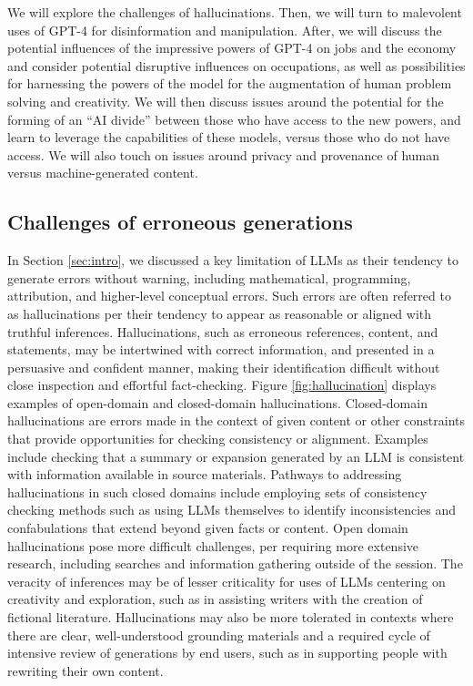 We will explore the challenges of hallucinations. Then, we will turn to malevolent uses of {GPT-4} for disinformation and manipulation.  After, we will discuss the potential influences of the impressive powers of {GPT-4} on jobs and the economy and consider potential disruptive influences on occupations, as well as possibilities for harnessing the powers of the model for the augmentation of human problem solving and creativity.  We will then discuss issues around the potential for the forming of an ``AI divide'' between those who have access to the new powers, and learn to leverage the capabilities of these models, versus those who do not have access. We will also touch on issues around privacy and provenance of human versus machine-generated content.

\subsection{Challenges of erroneous generations} 

In Section \ref{sec:intro}, we discussed a key limitation of LLMs as their tendency to generate errors without warning, including mathematical, programming, attribution, and higher-level conceptual errors. Such errors are often referred to as hallucinations per their tendency to appear as reasonable or aligned with truthful inferences. Hallucinations, such as erroneous references, content, and statements, may be intertwined with correct information, and presented in a persuasive and confident manner, making their identification difficult without close inspection and effortful fact-checking.  Figure \ref{fig:hallucination} displays examples of open-domain and closed-domain hallucinations. Closed-domain hallucinations are errors made in the context of given content or other constraints that provide opportunities for checking consistency or alignment. Examples include checking that a summary or expansion generated by an LLM is consistent with information available in source materials. Pathways to addressing hallucinations in such closed domains include employing sets of consistency checking methods such as using LLMs themselves to identify inconsistencies and confabulations that extend beyond given facts or content. Open domain hallucinations pose more difficult challenges, per requiring more extensive research, including searches and information gathering outside of the session. The veracity of inferences may be of lesser criticality for uses of LLMs centering on creativity and exploration, such as in assisting writers with the creation of fictional literature. Hallucinations may also be more tolerated in contexts where there are clear, well-understood grounding materials and a required cycle of intensive review of generations by end users, such as in supporting people with rewriting their own content. 

